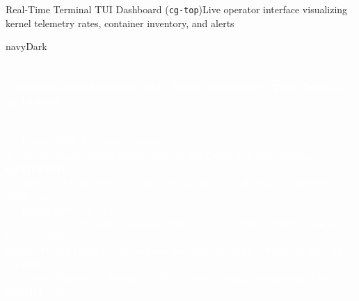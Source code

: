 \documentclass[aspectratio=169,10pt]{beamer}
\begin{document}
\begin{frame}{Real-Time Terminal TUI Dashboard (\texttt{cg-top})}{Live operator interface visualizing kernel telemetry rates, container inventory, and alerts}
  \begin{center}
    \begin{beamercolorbox}[wd=0.92\textwidth,rounded=true,shadow=false]{navyDark}
      \ttfamily\tiny\textcolor{white}{
      \textcolor{blueAccent}{========================================================================================}\\
      \textbf{ContainerGuard Enterprise v2.0 \textbar\ Mode: ENFORCE \textbar\ Time: 2026-11-24 14:40:05}\\
      \textcolor{blueAccent}{========================================================================================}\\
      \textcolor{amberDark}{[+] Kernel eBPF Telemetry Accounting:}\\
      \hspace*{0.2cm}Tracepoint Hooks: 25,032 \quad Submissions: 25,032 \quad Drops: 0 (0.00\%) \quad Invariant: \textcolor{emeraldDark}{\textbf{SATISFIED}}\\
      \textcolor{amberDark}{[+] Monitored Containers (3 active):} \textcolor{emeraldDark}{webapp-prod (12,410 execs) \textbar\ api-gateway (9,840 execs)}\\
      \textcolor{crimsonDark}{[+] Recent Intrusion Alerts:}\\
      \hspace*{0.2cm}\textcolor{crimsonDark}{CRITICAL} CG-RULE-001 Breakout Utility Executed [T1611,T1068] (Action: kill) [14:39:12]\\
      \hspace*{0.2cm}\textcolor{amberDark}{HIGH} \hspace*{0.4cm}CG-RULE-002 Execution From Writable Directory [T1059] (Action: kill) [14:39:55]\\
      \textcolor{blueAccent}{[+] Active Mitigations:} Action: kill TGID: 8841 Container: webapp-prod Status: \textcolor{emeraldDark}{SIGKILL sent}\\
      }
    \end{beamercolorbox}
  \end{center}
\end{frame}
\end{document}
